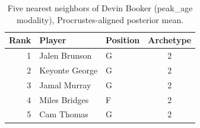 \begin{table}[htbp]
  \centering\small
  \begin{tabular}{rllc}
    \toprule
    Rank & Player & Position & Archetype \\
    \midrule
    1 & Jalen Brunson & G & 2 \\
    2 & Keyonte George & G & 2 \\
    3 & Jamal Murray & G & 2 \\
    4 & Miles Bridges & F & 2 \\
    5 & Cam Thomas & G & 2 \\
    \bottomrule
  \end{tabular}
  \caption{Five nearest neighbors of Devin Booker (peak_age modality), Procrustes-aligned posterior mean.}
  \label{tab:Devin_Booker_neighbors_peak_age}
\end{table}

